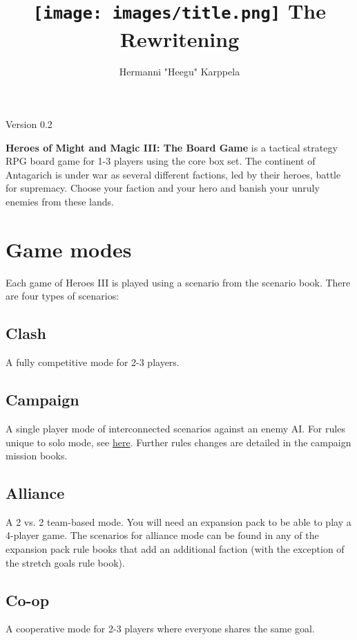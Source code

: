 \documentclass[12pt]{article}
\begin{document}
\title{\texttt{[image: images/title.png]} The Rewritening}

\author{Hermanni "Heegu" Karppela}
\maketitle



\begin{center}
Version 0.2
\end{center}

\tableofcontents

\clearpage

\textbf{Heroes of Might and Magic III: The Board Game} is a tactical strategy RPG board game for 1-3 players using the core box set. The continent of Antagarich is under war as several different factions, led by their heroes, battle for supremacy. Choose your faction and your hero and banish your unruly enemies from these lands.

\section{Game modes}
Each game of Heroes III is played using a scenario from the scenario book. There are four types of scenarios:
\subsection*{Clash}

A fully competitive mode for 2-3 players. 

\subsection*{Campaign}
A single player mode of interconnected scenarios against an enemy AI. For rules unique to solo mode, see \hyperlink{AIrules}{here}. Further rules changes are detailed in the campaign mission books.

\subsection*{Alliance}
A 2 vs. 2 team-based mode. You will need an expansion pack to be able to play a 4-player game. The scenarios for alliance mode can be found in any of the expansion pack rule books that add an additional faction (with the exception of the stretch goals rule book).

\subsection*{Co-op}
A cooperative mode for 2-3 players where everyone shares the same goal. 
\clearpage
\end{document}
